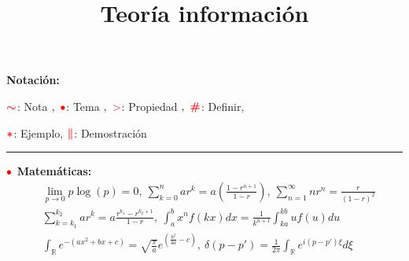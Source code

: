 \documentclass[%
 reprint,
 amsmath,amssymb,
 aps,
]{revtex4-1}
\begin{document}

\newcommand{\alfabeto}{\mathcal{A}_X}

\newcommand{\propiedad}{\textcolor{red}{\mathbf{>}}}
\newcommand{\definir}{\color{red}{\textbf{\#}}}
\newcommand{\tema}{\color{red}{\bullet}}
\newcommand{\nota}{\textcolor{red}{\color{red}{\boldsymbol{\sim}}}}
\newcommand{\ejemplo}{\textcolor{red}{\color{red}{\boldsymbol{*}}}}
\newcommand{\demo}{\textcolor{red}{\color{red}{\boldsymbol{\|}}}}

\newcommand*\sepline{%
  \rule[0.7ex]{.5\textwidth}{.5pt}}


\title{Teoría información}%

\maketitle

\textbf{Notación:}

$\nota$: Nota
$,\ \tema$: Tema
$,\ \propiedad$: Propiedad
$,\ \definir$: Definir,

$\ejemplo$: Ejemplo, $\demo$: Demostración

\sepline

\textbf{$\tema$ Matemáticas:}
$$
\begin{aligned}
&\lim _{p \rightarrow 0} p \log (p)=0, \ \sum_{k=0}^{n} a r^{k}=a\left(\frac{1-r^{n+1}}{1-r}\right), \
\sum_{n=1}^{\infty} n r^{n} =\frac{r}{(1-r)^{2}} \\ 
&\sum_{k=k_1}^{k_2} ar^k
=a \frac{r^{k_1} - r^{k_2 + 1}}{1-r}, 
\
\int_{a}^{b} x^n f(kx) dx = \frac{1}{k^{n+1}} \int_{ka}^{kb} u f(u) du
\\
%                 
&\int_{\mathbb{R}} e^{- (ax^2 + bx + c )} = \sqrt{\frac{\pi}{a}} e^{ ( \frac{b^2}{4a} - c )}
,\
\delta (p -p') = \frac{1}{2\pi} \int_{\mathbb{R}} e^{i(p-p')\xi} d\xi
\end{aligned}
$$
\end{document}
